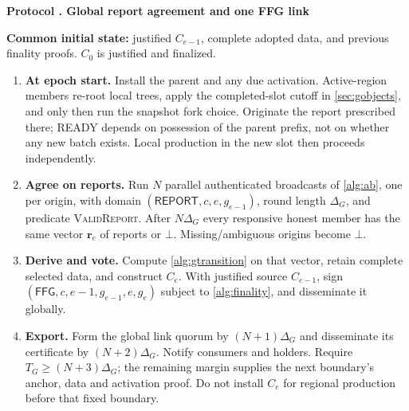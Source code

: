 \documentclass[11pt,a4paper,onecolumn]{article}
\newcommand{\botv}{\bot}
\newcommand{\Tag}[1]{\mathsf{#1}}
\newcommand{\Proc}[1]{\textnormal{\textsc{#1}}}
\theoremstyle{remark}\newtheorem{example}[definition]{Example}
\newcounter{protocol}
\newenvironment{protocol}[2]{\refstepcounter{protocol}\label{#1}\begin{mdframed}[nobreak=true,linewidth=.6pt,skipabove=10pt,skipbelow=10pt,innertopmargin=8pt,innerbottommargin=8pt]\small\raggedright\noindent\textbf{Protocol \theprotocol. #2}\par\smallskip}{\end{mdframed}}
\begin{document}
\begin{protocol}{alg:global}{Global report agreement and one FFG link}
\textbf{Common initial state:} justified $C_{e-1}$, complete adopted data,
and previous finality proofs. $C_0$ is justified and finalized.
\begin{enumerate}[label=\textbf{G\arabic*.}]
\item \textbf{At epoch start.} Install the parent and any due activation.
Active-region members re-root local trees, apply the completed-slot cutoff
in \cref{sec:gobjects}, and only then run the snapshot fork choice.
Originate the report prescribed there; READY depends on possession of the
parent prefix, not on whether any new batch exists. Local production in the
new slot then proceeds independently.
\item \textbf{Agree on reports.} Run $N$ parallel authenticated broadcasts
of \cref{alg:ab}, one per origin, with domain $(\Tag{REPORT},c,e,g_{e-1})$,
round length $\Delta_G$, and predicate \Proc{ValidReport}. After $N\Delta_G$
every responsive honest member has the same vector $\mathbf r_e$ of reports
or $\botv$. Missing/ambiguous origins become $\botv$.
\item \textbf{Derive and vote.} Compute \cref{alg:gtransition} on that vector,
retain complete selected data, and construct $C_e$. With justified source
$C_{e-1}$, sign $(\Tag{FFG},c,e-1,g_{e-1},e,g_e)$ subject to
\cref{alg:finality}, and disseminate it globally.
\item \textbf{Export.} Form the global link quorum by $(N+1)\Delta_G$ and
disseminate its certificate by $(N+2)\Delta_G$. Notify consumers and holders.
Require $T_G\geq(N+3)\Delta_G$; the remaining margin supplies the next
boundary's anchor, data and activation proof. Do not install $C_e$ for
regional production before that fixed boundary.
\end{enumerate}
\end{protocol}
\end{document}
